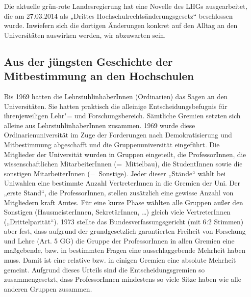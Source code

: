 Die aktuelle grün-rote Landesregierung hat eine Novelle des LHGs ausgearbeitet, 
die am 27.03.2014 als „Drittes Hochschulrechtsänderungsgesetz“ beschlossen wurde.
Inwiefern sich die dortigen Änderungen konkret auf den Alltag an den Universitäten 
auswirken werden, wir abzuwarten sein.


\subsection{Aus der jüngsten Geschichte der Mitbestimmung an den Hochschulen}


Bis 1969 hatten die LehrstuhlinhaberInnen (Ordinarien) das Sagen an den
Universitäten. Sie hatten praktisch die alleinige Entscheidungsbefugnis
für ihrenjeweiligen Lehr"= und Forschungsbereich. Sämtliche Gremien setzten
sich alleine aus LehrstuhlinhaberInnen zusammen. 1969 wurde diese
Ordinarienuniversität im Zuge der Forderungen nach Demokratisierung und
Mitbestimmung abgeschafft und die Gruppenuniversität eingeführt. Die
Mitglieder der Universität wurden in Gruppen eingeteilt, die
ProfessorInnen, die wissenschaftlichen MitarbeiterInnen (=\ Mittelbau), die
StudentInnen sowie die sonstigen MitarbeiterInnen (=\ Sonstige). Jeder
dieser „Stände“ wählt bei Uniwahlen eine bestimmte Anzahl VertreterInnen
in die Gremien der Uni. Der „erste Stand“, die ProfessorInnen, stellen
zusätzlich eine gewisse Anzahl von Mitgliedern kraft Amtes. Für eine kurze
Phase wählten alle Gruppen außer den Sonstigen (HausmeisterInnen,
SekretärInnen, \dots) gleich viele VertreterInnen („Drittelparität“).
1973 stellte das Bundesverfassungsgericht (mit 6:2 Stimmen) aber fest, dass
aufgrund der grundgesetzlich garantierten Freiheit von Forschung und Lehre
(Art. 5 GG) die Gruppe der ProfessorInnen in allen Gremien eine
maßgebende, bzw. in bestimmten Fragen eine ausschlaggebende Mehrheit haben
muss. Damit ist eine relative bzw. in einigen Gremien eine absolute
Mehrheit gemeint. Aufgrund dieses Urteils sind die Entscheidungsgremien so
zusammengesetzt, dass ProfessorInnen mindestens so viele Sitze haben wie
alle anderen Gruppen zusammen.




